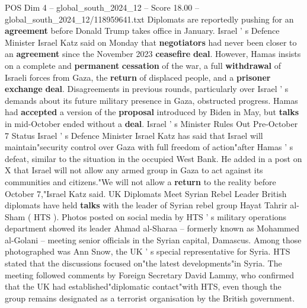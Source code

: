 \begin{textsample}{POS Dim 4 – global\_south\_2024\_12 – Score 18.00 – global\_south\_2024\_12/118959641.txt}
Diplomats are reportedly pushing for an \textbf{agreement} before Donald Trump takes office in January.
Israel ' s Defence Minister Israel Katz said on Monday that \textbf{negotiators} had never been closer to an \textbf{agreement} since the November 2023 \textbf{ceasefire} \textbf{deal}.
However, Hamas insists on a complete and \textbf{permanent} \textbf{cessation} of the war, a full \textbf{withdrawal} of Israeli forces from Gaza, the \textbf{return} of displaced people, and a \textbf{prisoner} \textbf{exchange} \textbf{deal}.
Disagreements in previous rounds, particularly over Israel ' s demands about its future military presence in Gaza, obstructed progress.
Hamas had \textbf{accepted} a version of the \textbf{proposal} introduced by Biden in May, but \textbf{talks} in mid-October ended without a \textbf{deal}.
Israel ' s Minister Rules Out Pre-October 7 Status Israel ' s Defence Minister Israel Katz has said that Israel will maintain"security control over Gaza with full freedom of action"after Hamas ' s defeat, similar to the situation in the occupied West Bank.
He added in a post on X that Israel will not allow any armed group in Gaza to act against its communities and citizens."We will not allow a \textbf{return} to the reality before October 7,"Israel Katz said.
UK Diplomats Meet Syrian Rebel Leader British diplomats have held \textbf{talks} with the leader of Syrian rebel group Hayat Tahrir al-Sham ( HTS ).
Photos posted on social media by HTS ' s military operations department showed its leader Ahmad al-Sharaa -- formerly known as Mohammed al-Golani -- meeting senior officials in the Syrian capital, Damascus.
Among those photographed was Ann Snow, the UK ' s special representative for Syria.
HTS stated that the discussions focused on"the latest developments"in Syria.
The meeting followed comments by Foreign Secretary David Lammy, who confirmed that the UK had established"diplomatic contact"with HTS, even though the group remains designated as a terrorist organisation by the British government.

\end{textsample}
